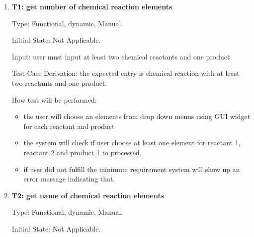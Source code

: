 \documentclass[12pt, titlepage]{article}
\begin{document}
\begin{enumerate}

\item{\bf T1: get number of chemical reaction elements \\}

Type: Functional, dynamic, Manual.
					
Initial State: Not Applicable. 
					
Input: user must input at least two chemical reactants and one product 
\begin{table}[h!]
\centering
{}
\caption{Input number of elements possible entries and its corresponding outputs }
\label{elementsnumber}
\end{table}

Test Case Derivation: the expected entry is chemical reaction with at least two reactants and one product. 

How test will be performed: 
\begin{itemize}
\item the user will choose an elements from drop down menus using GUI widget for each reactant and product
\item the system will check if user choose at least one element for reactant 1, reactant 2 and product 1 to processed. 
\item if user did not fulfill the minimum requirement system will show up an error massage indicating that. 
\end{itemize}

\item{\bf T2: get name of chemical reaction elements \\}

Type: Functional, dynamic, Manual.
					
Initial State: Not Applicable. 
					

\end{enumerate}
\end{document}
